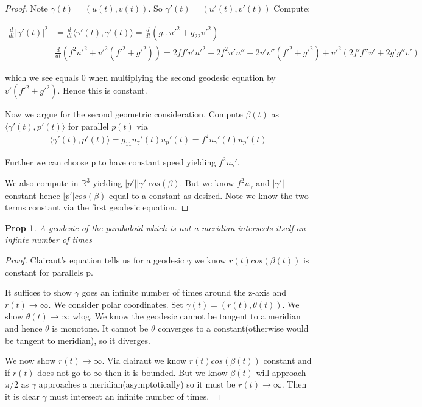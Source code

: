 \documentclass[11pt]{article}
\newcommand{\R}{\mathbb{R}}
\newtheorem{prop}{Prop}
\begin{document}

\begin{proof}
	Note $\gamma(t) = (u(t),v(t))$. So $\gamma'(t) = (u'(t),v'(t))$ Compute:

	\begin{align*}
		\frac{d}{dt}|\gamma'(t)|^2 &= \frac{d}{dt}\langle \gamma'(t),\gamma'(t)\rangle = \frac{d}{dt}(g_{11}u'^2 + g_{22}v'^2) \\
		&\frac{d}{dt}(f^2u'^2+v'^2(f'^2+g'^2)) = 2ff'v'u'^2+2f^2u'u''+ 2v'v''(f'^2+g'^2)+v'^2(2f'f''v'+2g'g''v')
	\end{align*}

	which we see equals 0 when multiplying the second geodesic equation by $v'(f'^2+g'^2)$. Hence this is constant.


	Now we argue for the second geometric consideration. Compute $\beta(t)$ as $\langle \gamma'(t),p'(t)\rangle$ for parallel $p(t)$ via
	\begin{align*}
		\langle \gamma'(t),p'(t)\rangle = g_{11}u_{\gamma}'(t)u_p'(t) =  f^2u_{\gamma}'(t)u_p'(t)
	\end{align*}

	Further we can choose p to have constant speed yielding $f^2u_{\gamma}'$.

	We also compute in $\R^3$ yielding $|p'||\gamma'|cos(\beta)$. But we know $f^2u_{\gamma}$ and $|\gamma'|$ constant hence $|p'|cos(\beta)$ equal to a constant as desired. Note we know the two terms constant via the first geodesic equation.


\end{proof}

\begin{prop}
	A geodesic of the paraboloid which is not a meridian intersects itself an infinte number of times
\end{prop}

\begin{proof}
	Clairaut's equation tells us for a geodesic $\gamma$ we know $r(t)cos(\beta(t))$ is constant for parallels p. 

	It suffices to show $\gamma$ goes an infinite number of times around the z-axis and $r(t) \to \infty$. We consider polar coordinates. Set $\gamma(t) = (r(t),\theta(t))$. We show $\theta(t) \to \infty$ wlog. We know the geodesic cannot be tangent to a meridian and hence $\theta$ is monotone. It cannot be $\theta$ converges to a constant(otherwise would be tangent to meridian), so it diverges. 

	We now show $r(t) \to \infty$. Via clairaut we know $r(t)cos(\beta(t))$ constant and if $r(t)$ does not go to $\infty$ then it is bounded. But we know $\beta(t)$ will approach $\pi/2$ as $\gamma$ approaches a meridian(asymptotically) so it must be $r(t) \to \infty$. Then it is clear $\gamma$ must intersect an infinite number of times.
\end{proof}
\end{document}
